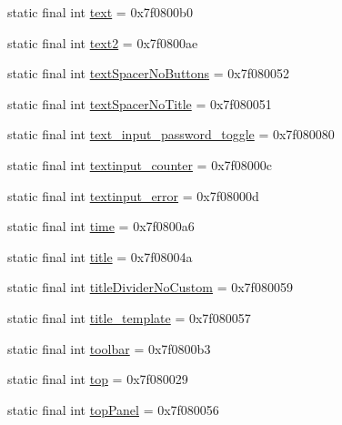 \begin{CompactItemize}
\item 
static final int \hyperlink{classandroid_1_1support_1_1v7_1_1recyclerview_1_1_r_1_1id_f5bcee7b0eda4b774ad5c96dca63ee1a}{text} = 0x7f0800b0
\item 
static final int \hyperlink{classandroid_1_1support_1_1v7_1_1recyclerview_1_1_r_1_1id_48ca8c1d5774028b0de1b505038230bf}{text2} = 0x7f0800ae
\item 
static final int \hyperlink{classandroid_1_1support_1_1v7_1_1recyclerview_1_1_r_1_1id_34ffe92d78eebe9c04f4cbd4e9e6b017}{textSpacerNoButtons} = 0x7f080052
\item 
static final int \hyperlink{classandroid_1_1support_1_1v7_1_1recyclerview_1_1_r_1_1id_144c98d6773df7455ae0f612248e4f37}{textSpacerNoTitle} = 0x7f080051
\item 
static final int \hyperlink{classandroid_1_1support_1_1v7_1_1recyclerview_1_1_r_1_1id_718ddf516d59d444dfaa3c26a231afee}{text\_\-input\_\-password\_\-toggle} = 0x7f080080
\item 
static final int \hyperlink{classandroid_1_1support_1_1v7_1_1recyclerview_1_1_r_1_1id_1a2eac02faeab21ab071df7b48998a9d}{textinput\_\-counter} = 0x7f08000c
\item 
static final int \hyperlink{classandroid_1_1support_1_1v7_1_1recyclerview_1_1_r_1_1id_6188ca68279316b5739c2d06d90aca9a}{textinput\_\-error} = 0x7f08000d
\item 
static final int \hyperlink{classandroid_1_1support_1_1v7_1_1recyclerview_1_1_r_1_1id_5d9b2fa699075c0487987ad174b5e1de}{time} = 0x7f0800a6
\item 
static final int \hyperlink{classandroid_1_1support_1_1v7_1_1recyclerview_1_1_r_1_1id_f639388699fc3035f92c846d488290fb}{title} = 0x7f08004a
\item 
static final int \hyperlink{classandroid_1_1support_1_1v7_1_1recyclerview_1_1_r_1_1id_4be86919db084fe31543d6d06957943b}{titleDividerNoCustom} = 0x7f080059
\item 
static final int \hyperlink{classandroid_1_1support_1_1v7_1_1recyclerview_1_1_r_1_1id_bf5465111f5b5683be709306982ea12e}{title\_\-template} = 0x7f080057
\item 
static final int \hyperlink{classandroid_1_1support_1_1v7_1_1recyclerview_1_1_r_1_1id_901ee327a948748534166a3c8d0e3af8}{toolbar} = 0x7f0800b3
\item 
static final int \hyperlink{classandroid_1_1support_1_1v7_1_1recyclerview_1_1_r_1_1id_87a5e014a724cf78acf722314e58c9ba}{top} = 0x7f080029
\item 
static final int \hyperlink{classandroid_1_1support_1_1v7_1_1recyclerview_1_1_r_1_1id_61e1d074cb0a7aa0b64c60b9a116ee70}{topPanel} = 0x7f080056

\end{CompactItemize}
